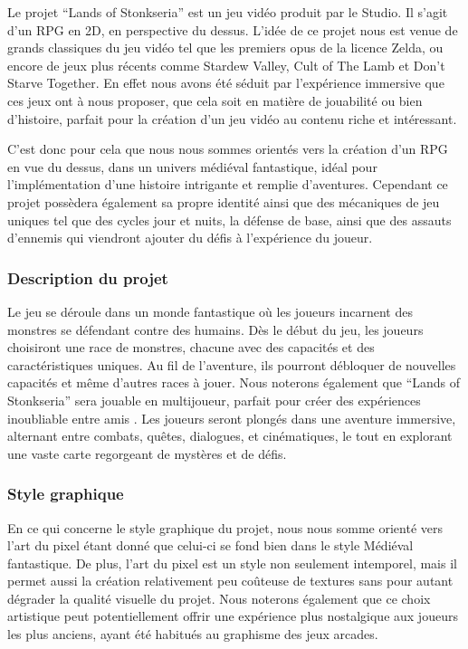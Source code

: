 


\vspace*{0.2cm}

Le projet “Lands of Stonkseria” est un jeu vidéo produit par le Studio.
Il s’agit d’un RPG en 2D, en perspective du dessus.
L’idée de ce projet nous est venue de grands classiques du jeu vidéo tel que les premiers opus de la licence Zelda, 
ou encore de jeux plus récents comme Stardew Valley, Cult of The Lamb et Don’t Starve Together.
En effet nous avons été séduit par l'expérience immersive que ces jeux ont à nous proposer, que cela soit en matière de jouabilité ou bien d’histoire, 
parfait pour la création d’un jeu vidéo au contenu riche et intéressant.

C’est donc pour cela que nous nous sommes orientés vers la création d’un RPG en vue du dessus, dans un univers médiéval fantastique, 
idéal pour l’implémentation d’une histoire intrigante et remplie d’aventures.
Cependant ce projet possèdera également sa propre identité ainsi que des mécaniques de jeu uniques tel que des cycles jour et nuits, 
la défense de base, ainsi que des assauts d’ennemis qui viendront ajouter du défis à l'expérience du joueur.

\subsubsection*{\hspace*{0.6cm}Description du projet}

Le jeu se déroule dans un monde fantastique où les joueurs incarnent des monstres se défendant contre des humains.
Dès le début du jeu, les joueurs choisiront une race de monstres, chacune avec des capacités et des caractéristiques uniques.
Au fil de l'aventure, ils pourront débloquer de nouvelles capacités et même d'autres races à jouer.
Nous noterons également que “Lands of Stonkseria” sera jouable en multijoueur, parfait pour créer des expériences  inoubliable entre amis .
Les joueurs seront plongés dans une aventure immersive, alternant entre combats, quêtes, dialogues, et cinématiques, 
le tout en explorant une vaste carte regorgeant de mystères et de défis.

\subsubsection*{\hspace*{0.6cm}Style graphique}

En ce qui concerne le style graphique du projet, nous nous somme orienté vers l’art du pixel étant donné que celui-ci se fond bien dans le style Médiéval fantastique.
De plus, l’art du pixel est un style non seulement intemporel, mais il permet aussi la création relativement peu coûteuse de textures sans pour autant dégrader la qualité visuelle du projet.
Nous noterons également que ce choix artistique peut potentiellement offrir une expérience plus nostalgique aux joueurs les plus anciens, ayant été habitués au graphisme des jeux arcades.
